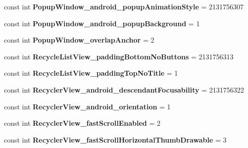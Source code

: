 \begin{DoxyCompactItemize}
const int {\bfseries Popup\+Window\+\_\+android\+\_\+popup\+Animation\+Style} = 2131756307
\item 
\mbox{\label{classst_delivery_1_1_resource_1_1_styleable_a7a99464db9b82464527c1176f294b745}} 
const int {\bfseries Popup\+Window\+\_\+android\+\_\+popup\+Background} = 1
\item 
\mbox{\label{classst_delivery_1_1_resource_1_1_styleable_a5c31bcd579a3956616c4c915675e6aff}} 
const int {\bfseries Popup\+Window\+\_\+overlap\+Anchor} = 2
\item 
\mbox{\label{classst_delivery_1_1_resource_1_1_styleable_af0c4320bb676b5967899d8b71c03f4a3}} 
const int {\bfseries Recycle\+List\+View\+\_\+padding\+Bottom\+No\+Buttons} = 2131756313
\item 
\mbox{\label{classst_delivery_1_1_resource_1_1_styleable_abfb120c70ffba061a1035c0f26e5c866}} 
const int {\bfseries Recycle\+List\+View\+\_\+padding\+Top\+No\+Title} = 1
\item 
\mbox{\label{classst_delivery_1_1_resource_1_1_styleable_afa79e023f31d43f5c9befa548e864802}} 
const int {\bfseries Recycler\+View\+\_\+android\+\_\+descendant\+Focusability} = 2131756322
\item 
\mbox{\label{classst_delivery_1_1_resource_1_1_styleable_a2228c619d9d44d615c23f43800d97058}} 
const int {\bfseries Recycler\+View\+\_\+android\+\_\+orientation} = 1
\item 
\mbox{\label{classst_delivery_1_1_resource_1_1_styleable_a47480b17b0d1117ea1af65c4c89ac73b}} 
const int {\bfseries Recycler\+View\+\_\+fast\+Scroll\+Enabled} = 2
\item 
\mbox{\label{classst_delivery_1_1_resource_1_1_styleable_aaae86783e4532e11fe805aa98c2e9845}} 
const int {\bfseries Recycler\+View\+\_\+fast\+Scroll\+Horizontal\+Thumb\+Drawable} = 3
\item 

\end{DoxyCompactItemize}
